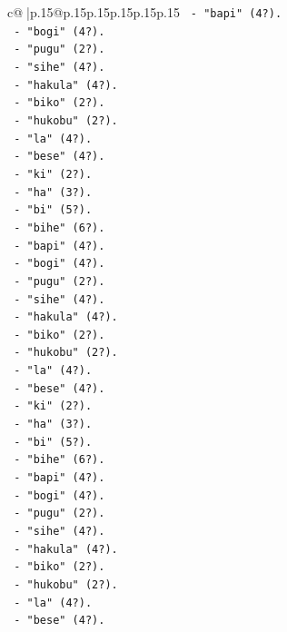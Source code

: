 \documentclass{article}
\begin{document}
{\begin{supertabular}{c@{$\;$}|p{.15\linewidth}@{}p{.15\linewidth}p{.15\linewidth}p{.15\linewidth}p{.15\linewidth}p{.15\linewidth}}
{{{\texttt{       {-} "bapi" (4?).} \\
\texttt{       {-} "bogi" (4?).} \\
\texttt{       {-} "pugu" (2?).} \\
\texttt{       {-} "sihe" (4?).} \\
\texttt{       {-} "hakula" (4?).} \\
\texttt{       {-} "biko" (2?).} \\
\texttt{       {-} "hukobu" (2?).} \\
\texttt{       {-} "la" (4?).} \\
\texttt{       {-} "bese" (4?).} \\
\texttt{       {-} "ki" (2?).} \\
\texttt{       {-} "ha" (3?).} \\
\texttt{       {-} "bi" (5?).} \\
\texttt{       {-} "bihe" (6?).} \\
\texttt{       {-} "bapi" (4?).} \\
\texttt{       {-} "bogi" (4?).} \\
\texttt{       {-} "pugu" (2?).} \\
\texttt{       {-} "sihe" (4?).} \\
\texttt{       {-} "hakula" (4?).} \\
\texttt{       {-} "biko" (2?).} \\
\texttt{       {-} "hukobu" (2?).} \\
\texttt{       {-} "la" (4?).} \\
\texttt{       {-} "bese" (4?).} \\
\texttt{       {-} "ki" (2?).} \\
\texttt{       {-} "ha" (3?).} \\
\texttt{       {-} "bi" (5?).} \\
\texttt{       {-} "bihe" (6?).} \\
\texttt{       {-} "bapi" (4?).} \\
\texttt{       {-} "bogi" (4?).} \\
\texttt{       {-} "pugu" (2?).} \\
\texttt{       {-} "sihe" (4?).} \\
\texttt{       {-} "hakula" (4?).} \\
\texttt{       {-} "biko" (2?).} \\
\texttt{       {-} "hukobu" (2?).} \\
\texttt{       {-} "la" (4?).} \\
\texttt{       {-} "bese" (4?).} \\
}}}
\end{supertabular}}
\end{document}

